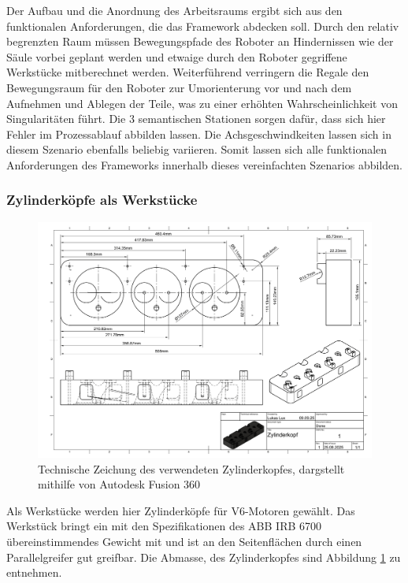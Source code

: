 Der Aufbau und die Anordnung des Arbeitsraums ergibt sich aus den funktionalen
Anforderungen, die das Framework abdecken soll. Durch den relativ begrenzten
Raum müssen Bewegungspfade des Roboter an Hindernissen wie der Säule vorbei
geplant werden und etwaige durch den Roboter gegriffene Werkstücke
mitberechnet werden. Weiterführend verringern die Regale den Bewegungsraum für
den Roboter zur Umorienterung vor und nach dem Aufnehmen und Ablegen der Teile,
was zu einer erhöhten Wahrscheinlichkeit von Singularitäten führt. Die 3
semantischen Stationen sorgen dafür, dass sich hier Fehler im Prozessablauf
abbilden lassen. Die Achsgeschwindkeiten lassen sich in diesem Szenario
ebenfalls beliebig variieren. Somit lassen sich alle funktionalen Anforderungen
des Frameworks innerhalb dieses vereinfachten Szenarios abbilden.

\subsubsection{Zylinderköpfe als Werkstücke}

\begin{figure}[H]
	\centering
	\includegraphics[width=\linewidth]{Figures/CyclinderHead-1.png}
	\caption{Technische Zeichung des verwendeten Zylinderkopfes, dargstellt
		mithilfe von Autodesk Fusion 360}
	\label{figure:cylinderhead}
\end{figure}

Als Werkstücke werden hier Zylinderköpfe für V6-Motoren gewählt. Das Werkstück
bringt ein mit den Spezifikationen des ABB IRB 6700 übereinstimmendes Gewicht
mit und ist an den Seitenflächen durch einen Parallelgreifer gut greifbar. Die
Abmasse, des Zylinderkopfes sind Abbildung \ref{figure:cylinderhead}
zu entnehmen.

